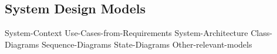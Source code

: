 \subsection{System Design Models}
{System-Context}
{Use-Cases-from-Requirements}
{System-Architecture}
{Class-Diagrams}
{Sequence-Diagrams}
{State-Diagrams}
{Other-relevant-models}
